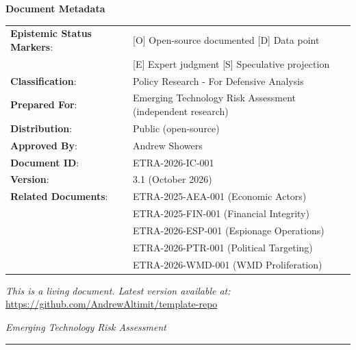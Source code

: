 \documentclass[11pt,letterpaper]{article}
\begin{document}
\begin{center}
\small
\textbf{Document Metadata}

\vspace{0.5em}
\begin{tabular}{ll}
\textbf{Epistemic Status Markers}: & [O] Open-source documented \textbar{} [D] Data point \\
& [E] Expert judgment \textbar{} [S] Speculative projection \\
\textbf{Classification}: & Policy Research - For Defensive Analysis \\
\textbf{Prepared For}: & Emerging Technology Risk Assessment (independent research) \\
\textbf{Distribution}: & Public (open-source) \\
\textbf{Approved By}: & Andrew Showers \\
\textbf{Document ID}: & ETRA-2026-IC-001 \\
\textbf{Version}: & 3.1 (October 2026) \\
\textbf{Related Documents}: & ETRA-2025-AEA-001 (Economic Actors) \\
& ETRA-2025-FIN-001 (Financial Integrity) \\
& ETRA-2026-ESP-001 (Espionage Operations) \\
& ETRA-2026-PTR-001 (Political Targeting) \\
& ETRA-2026-WMD-001 (WMD Proliferation) \\
\end{tabular}
\end{center}

\vspace{0.3cm}

\begin{center}
\small
\textit{This is a living document. Latest version available at:}\\[0.3em]
\url{https://github.com/AndrewAltimit/template-repo}
\end{center}

\vspace{0.3cm}

\begin{center}
\textit{Emerging Technology Risk Assessment}
\end{center}

\vspace{0.5cm}

\noindent\rule{\textwidth}{0.4pt}

\vspace{0.3cm}
\end{document}
